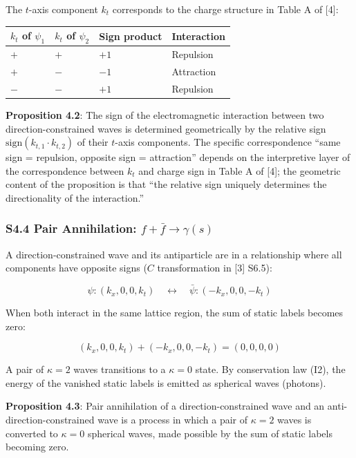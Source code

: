 \documentclass[
  a4paper,11pt]{article}
\newcounter{none}
\theoremstyle{definition}
\theoremstyle{remark}
\begin{document}
The \(t\)-axis component \(k_t\) corresponds to the charge structure in
Table A of {[}4{]}:

{\def\LTcaptype{none} %
\begin{longtable}[]{@{}llll@{}}
\toprule\noalign{}
\(k_t\) of \(\psi_1\) & \(k_t\) of \(\psi_2\) & Sign product &
Interaction \\
\midrule\noalign{}
\endhead
\bottomrule\noalign{}
\endlastfoot
\(+\) & \(+\) & \(+1\) & Repulsion \\
\(+\) & \(-\) & \(-1\) & Attraction \\
\(-\) & \(-\) & \(+1\) & Repulsion \\
\end{longtable}
}

\textbf{Proposition 4.2}: The sign of the electromagnetic interaction
between two direction-constrained waves is determined geometrically by
the relative sign \(\mathrm{sign}(k_{t,1} \cdot k_{t,2})\) of their
\(t\)-axis components. The specific correspondence ``same sign =
repulsion, opposite sign = attraction'' depends on the interpretive
layer of the correspondence between \(k_t\) and charge sign in Table A
of {[}4{]}; the geometric content of the proposition is that ``the
relative sign uniquely determines the directionality of the
interaction.''

\subsubsection{\texorpdfstring{S4.4 Pair Annihilation:
\(f + \bar{f} \to \gamma(s)\)}{S4.4 Pair Annihilation: f + \textbackslash bar\{f\} \textbackslash to \textbackslash gamma(s)}}\label{s4.4-pair-annihilation-f-barf-to-gammas}

A direction-constrained wave and its antiparticle are in a relationship
where all components have opposite signs (\(C\) transformation in
{[}3{]} S6.5):

\[\psi: (k_x, 0, 0, k_t) \quad \longleftrightarrow \quad \bar{\psi}: (-k_x, 0, 0, -k_t)\]

When both interact in the same lattice region, the sum of static labels
becomes zero:

\[(k_x, 0, 0, k_t) + (-k_x, 0, 0, -k_t) = (0, 0, 0, 0)\]

A pair of \(\kappa = 2\) waves transitions to a \(\kappa = 0\) state. By
conservation law (I2), the energy of the vanished static labels is
emitted as spherical waves (photons).

\textbf{Proposition 4.3}: Pair annihilation of a direction-constrained
wave and an anti-direction-constrained wave is a process in which a pair
of \(\kappa = 2\) waves is converted to \(\kappa = 0\) spherical waves,
made possible by the sum of static labels becoming zero.
\end{document}
